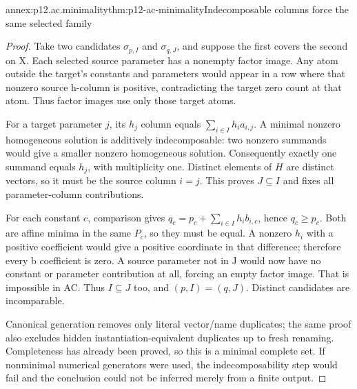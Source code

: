 \begin{annexitem}{annex:p12.ac.minimality}{thm:p12-ac-minimality}{Indecomposable columns force the same selected family}
\begin{proof}
Take two candidates \(\sigma_{p,I}\) and \(\sigma_{q,J}\),
and suppose the first covers the second on X. Each selected source
parameter has a nonempty factor image. Any atom outside the target's
constants and parameters would appear in a row where that nonzero
source h-column is positive, contradicting the target zero count
at that atom. Thus factor images use only those target atoms.

For a target parameter \(j\), its \(h_j\) column equals
\(\sum_{i\in I}h_i a_{i,j}\). A minimal nonzero homogeneous
solution is additively indecomposable: two nonzero summands would
give a smaller nonzero homogeneous solution. Consequently exactly
one summand equals \(h_j\), with multiplicity one. Distinct elements
of \(H\) are distinct vectors, so it must be the source column \(i=j\).
This proves \(J\subseteq I\) and fixes all parameter-column
contributions.

For each constant \(c\), comparison gives
\(q_c=p_c+\sum_{i\in I}h_i b_{i,c}\), hence \(q_c\geq p_c\).
Both are affine minima in the same \(P_c\), so they must be equal.
A nonzero \(h_i\) with a positive coefficient would give a positive
coordinate in that difference; therefore every b coefficient is
zero. A source parameter not in J would now have no constant or
parameter contribution at all, forcing an empty factor image.
That is impossible in AC. Thus \(I\subseteq J\) too, and
\((p,I)=(q,J)\). Distinct candidates are incomparable.

Canonical generation removes only literal vector/name duplicates;
the same proof also excludes hidden instantiation-equivalent
duplicates up to fresh renaming. Completeness has already been
proved, so this is a minimal complete set. If nonminimal numerical
generators were used, the indecomposability step would fail and
the conclusion could not be inferred merely from a finite output.
\end{proof}
\end{annexitem}
